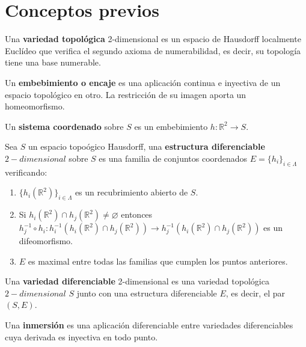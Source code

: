 
\chapter{Conceptos previos}

\begin{definicion} Una \textbf{variedad topológica} 2-dimensional es un espacio de Hausdorff localmente Euclídeo que verifica el segundo axioma de numerabilidad, es decir, su topología tiene una base numerable.
\end{definicion}

\begin{definicion} Un \textbf{embebimiento o encaje} es una aplicación continua e inyectiva de un espacio topológico en otro. La restricción de su imagen aporta un homeomorfismo.
\end{definicion}

\begin{definicion} Un \textbf{sistema coordenado} sobre $S$ es un embebimiento $h : \mathbb{R}^2 \rightarrow S$.
\end{definicion}

\begin{definicion} Sea $S$ un espacio topoógico Hausdorff, una \textbf{estructura diferenciable} $2-dimensional$ sobre $S$ es una familia de conjuntos coordenados $E=\{h_i\}_{i\in \Lambda}$ verificando:
	\begin{enumerate}
		\item $\{h_i(\mathbb{R}^2)\}_{i\in \Lambda}$ es un recubrimiento abierto de $S$.
		\item Si $h_i(\mathbb{R}^2) \cap h_j(\mathbb{R}^2) \neq \varnothing$ entonces $h_j^{-1} \circ h_i:h_i^{-1}(h_i(\mathbb{R}^2)\cap h_j(\mathbb{R}^2)) \rightarrow h_j^{-1}(h_i(\mathbb{R}^2)\cap h_j(\mathbb{R}^2))$ es un difeomorfismo.
		\item $E$ es maximal entre todas las familias que cumplen los puntos anteriores.
	\end{enumerate}
\end{definicion}

\begin{definicion} Una \textbf{variedad diferenciable} 2-dimensional es una variedad topológica $2-dimensional$ $S$ junto con una estructura diferenciable $E$, es decir, el par $(S, E)$.
\end{definicion}

\begin{definicion} Una \textbf{inmersión} es una aplicación diferenciable entre variedades diferenciables cuya derivada es inyectiva en todo punto.
\end{definicion}

